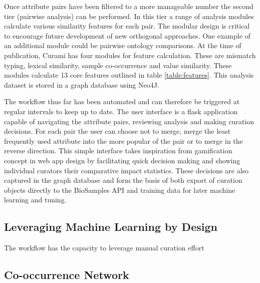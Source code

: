 \documentclass{bmcart}
\begin{document}
Once attribute pairs have been filtered to a more manageable number the second tier (pairwise analysis) can be performed. In this tier a range of analysis modules calculate various similarity features for each pair. The modular design is critical to encourage future development of new orthogonal approaches. One example of an additional module could be pairwise ontology comparisons. At the time of publication, Curami has four modules for feature calculation. These are mismatch typing, lexical similarity, sample co-occurrence and value similarity. These modules calculate 13 core features outlined in table \ref{table:features}. This analysis dataset is stored in a graph database using Neo4J.

The workflow thus far has been automated and can therefore be triggered at regular intervals to keep up to date. The user interface is a flask application capable of navigating the attribute pairs, reviewing analysis and making curation decisions. For each pair the user can choose not to merge, merge the least frequently used attribute into the more popular of the pair or to merge in the reverse direction. This simple interface takes inspiration from gamification concept in web app design by facilitating quick decision making and showing individual curators their comparative impact statistics. These decisions are also captured in the graph database and form the basis of both export of curation objects directly to the BioSamples API and training data for later machine learning and tuning.

\subsection*{Leveraging Machine Learning by Design}

The workflow has the capacity to leverage manual curation effort

\subsection*{}

\subsection*{Co-occurrence Network}
\end{document}

